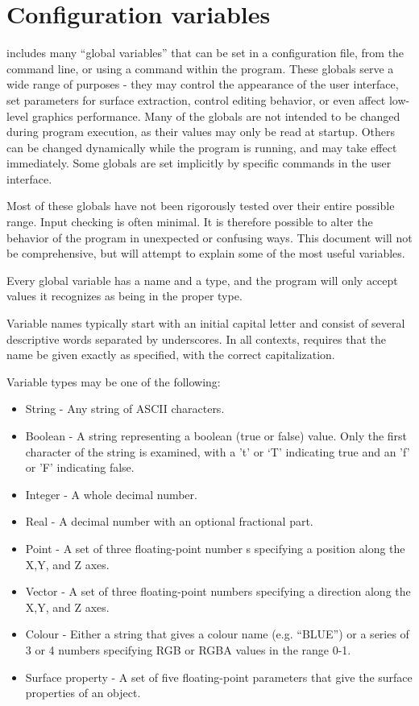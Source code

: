 \section{Configuration variables}
\label{secGlobals}

\display{} includes many ``global variables'' that can be set in a
configuration file, from the command line, or using a command within
the program.  These globals serve a wide range of
purposes - they may control the appearance of the user interface, set
parameters for surface extraction, control editing behavior, or even
affect low-level graphics performance. Many of the globals are not
intended to be changed during program execution, as their values may
only be read at startup. Others can be changed dynamically while the
program is running, and may take effect immediately. Some globals are
set implicitly by specific commands in the \display{} user interface.

Most of these globals have not been rigorously tested over their
entire possible range. Input checking is often minimal. It is
therefore possible to alter the behavior of the program in unexpected
or confusing ways. This document will not be comprehensive, but will
attempt to explain some of the most useful variables.

Every global variable has a name and a type, and the program will only
accept values it recognizes as being in the proper type. 

Variable names typically start with an initial capital letter and
consist of several descriptive words separated by underscores. In all
contexts, \display{} requires that the name be given exactly as
specified, with the correct capitalization.

Variable types may be one of the following:
\begin{itemize}
\item String - Any string of ASCII characters.
\item Boolean - A string representing a boolean (true or false) value. Only the first character of the string is examined, with a 't' or `T' indicating true and an 'f' or 'F' indicating false.
\item Integer - A whole decimal number.
\item Real - A decimal number with an optional fractional part.
\item Point - A set of three floating-point number
s specifying a position
along the X,Y, and Z axes.
\item Vector - A set of three floating-point numbers specifying a direction
along the X,Y, and Z axes.
\item Colour - Either a string that gives a colour name (e.g. ``BLUE'') or a series of 3 or 4 numbers specifying RGB or RGBA values in the range 0-1.
\item Surface property - A set of five floating-point parameters that give
the surface properties of an object.
\end{itemize}

